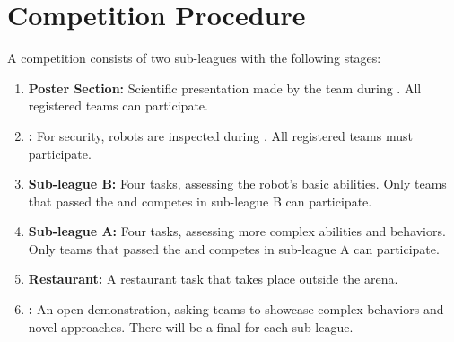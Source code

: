 \section{Competition Procedure}
\label{sec:rules:competitionprocedure}

A \RoboCup\AtHome{} competition consists of two sub-leagues with the following stages:

\begin{enumerate}
	\item \textbf{Poster Section:} Scientific presentation made by the team during \SetupDays{}.
 	All registered teams can participate.

	\item \textbf{\RobotInspection{}:} For security, robots are inspected during \SetupDays{}.
	All registered teams must participate.

	\item \textbf{Sub-league B:} Four tasks, assessing the robot's basic abilities.
 	Only teams that passed the \RobotInspection{} and competes in sub-league B can participate.

	\item \textbf{Sub-league A:} Four tasks, assessing more complex abilities and behaviors.
 	Only teams that passed the \RobotInspection{} and competes in sub-league A can participate.

	\item \textbf{Restaurant:} A restaurant task that takes place outside the arena.

	\item \textbf{\FINAL{}:} An open demonstration, asking teams to showcase complex behaviors and novel approaches. There will be a final for each sub-league.
\end{enumerate}

